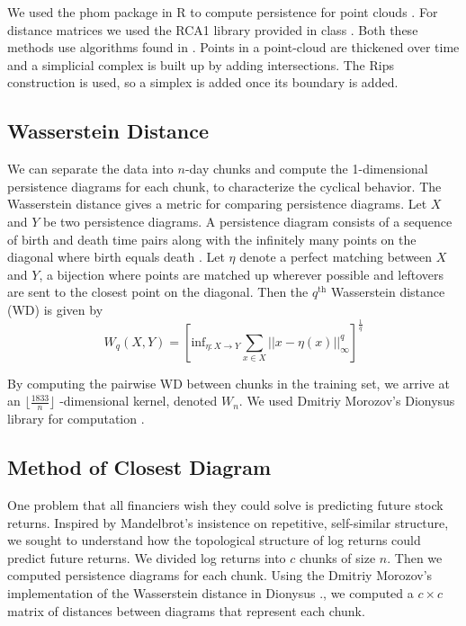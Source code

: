 \documentclass{article}
\begin{document}
We used the phom package in R to compute persistence for point clouds \cite{phom}. For distance matrices we used the RCA1 library provided in class \cite{TDA}. Both these methods use algorithms found in \cite{de2011}. Points in a point-cloud are thickened over time and a simplicial complex is built up by adding intersections. The Rips construction is used, so a simplex is added once its boundary is added.

\subsection{Wasserstein Distance}

We can separate the data into $n$-day chunks and compute the 1-dimensional persistence diagrams for each chunk, to characterize the cyclical behavior. The Wasserstein distance gives a metric for comparing persistence diagrams. Let $X$ and $Y$ be two persistence diagrams. A persistence diagram consists of a sequence of birth and death time pairs along with the infinitely many points on the diagonal where birth equals death . Let $\eta$ denote a perfect matching between $X$ and $Y$, a bijection where points are matched up wherever possible and leftovers are sent to the closest point on the diagonal. Then the $q^{\text{th}}$ Wasserstein distance (WD)  is given by 
\[
W_q(X,Y) = \left[ \text{inf}_{\eta:X \rightarrow Y} \sum_{x \in X} || x  - \eta(x) ||^q_\infty \right]^{\frac{1}{q}}
\]

By computing the pairwise WD between chunks in the training set, we arrive at an $\lfloor \frac{1833}{n} \rfloor$ -dimensional kernel, denoted $W_n$. We used Dmitriy Morozov’s Dionysus library for computation \cite{morozov2012}.

\newpage

\subsection{Method of Closest Diagram}
One problem that all financiers wish they could solve is predicting future stock returns. Inspired by Mandelbrot’s insistence on repetitive, self-similar structure, we sought to understand how the topological structure of log returns could predict future returns. We divided log returns into $c$ chunks of size $n$. Then we computed persistence diagrams for each chunk. Using the Dmitriy Morozov’s implementation of the Wasserstein distance in Dionysus \cite{morozov2012}., we computed a $c \times c$ matrix of distances between diagrams that represent each chunk.
\end{document}
